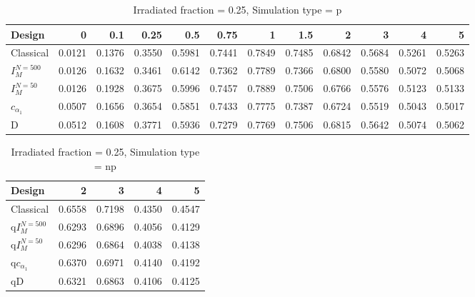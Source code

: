 \documentclass[a4paper]{article}
\begin{document}
\begin{table}[ht]
\centering
\begin{tabular}{lrrrrrrrrrrr}
  \hline
Design & 0 & 0.1 & 0.25 & 0.5 & 0.75 & 1 & 1.5 & 2 & 3 & 4 & 5 \\ 
  \hline
Classical & 0.0121 & 0.1376 & 0.3550 & 0.5981 & 0.7441 & 0.7849 & 0.7485 & 0.6842 & 0.5684 & 0.5261 & 0.5263 \\ 
  $I_M^{N=500}$ & 0.0126 & 0.1632 & 0.3461 & 0.6142 & 0.7362 & 0.7789 & 0.7366 & 0.6800 & 0.5580 & 0.5072 & 0.5068 \\ 
  $I_M^{N=50}$ & 0.0126 & 0.1928 & 0.3675 & 0.5996 & 0.7457 & 0.7889 & 0.7506 & 0.6766 & 0.5576 & 0.5123 & 0.5133 \\ 
  $c_{\alpha_1}$ & 0.0507 & 0.1656 & 0.3654 & 0.5851 & 0.7433 & 0.7775 & 0.7387 & 0.6724 & 0.5519 & 0.5043 & 0.5017 \\ 
  D & 0.0512 & 0.1608 & 0.3771 & 0.5936 & 0.7279 & 0.7769 & 0.7506 & 0.6815 & 0.5642 & 0.5074 & 0.5062 \\ 
   \hline
\end{tabular}
\caption{Irradiated fraction = 0.25, Simulation type = p} 
\end{table}

\begin{table}[ht]
\centering
\begin{tabular}{lrrrr}
  \hline
Design & 2 & 3 & 4 & 5 \\ 
  \hline
Classical & 0.6558 & 0.7198 & 0.4350 & 0.4547 \\ 
  q$I_M^{N=500}$ & 0.6293 & 0.6896 & 0.4056 & 0.4129 \\ 
  q$I_M^{N=50}$ & 0.6296 & 0.6864 & 0.4038 & 0.4138 \\ 
  q$c_{\alpha_1}$ & 0.6370 & 0.6971 & 0.4140 & 0.4192 \\ 
  qD & 0.6321 & 0.6863 & 0.4106 & 0.4125 \\ 
   \hline
\end{tabular}
\caption{Irradiated fraction = 0.25, Simulation type = np} 
\end{table}
\end{document}
